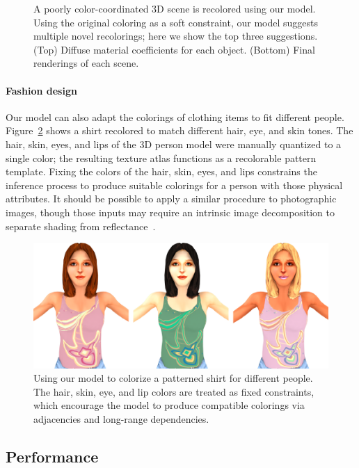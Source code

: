 \begin{figure}[ht]
\caption{A poorly color-coordinated 3D scene is recolored using our model. Using the original coloring as a soft constraint, our model suggests multiple novel recolorings; here we show the top three suggestions. (Top) Diffuse material coefficients for each object. (Bottom) Final renderings of each scene.}
\label{fig:sceneRecoloring}
\vspace{-1.0em}
\end{figure}

\paragraph{Fashion design}
Our model can also adapt the colorings of clothing items to fit different people. Figure~\ref{fig:fashion} shows a shirt recolored to match different hair, eye, and skin tones. The hair, skin, eyes, and lips of the 3D person model were manually quantized to a single color; the resulting texture atlas functions as a recolorable pattern template. Fixing the colors of the hair, skin, eyes, and lips constrains the inference process to produce suitable colorings for a person with those physical attributes. It should be possible to apply a similar procedure to photographic images, though those inputs may require an intrinsic image decomposition to separate shading from reflectance~\cite{IntrinsicImages}.

\begin{figure}[ht!]
\centering
\includegraphics[width=\columnwidth]{figs/fashion/composite}
\caption{Using our model to colorize a patterned shirt for different people. The hair, skin, eye, and lip colors are treated as fixed constraints, which encourage the model to produce compatible colorings via adjacencies and long-range dependencies.}
\label{fig:fashion}
\end{figure}

\subsection{Performance}

